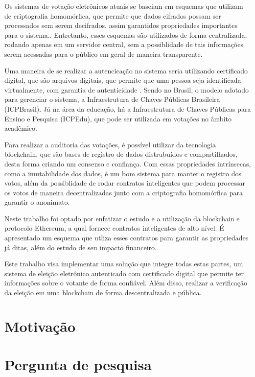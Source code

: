 \documentclass{ufsctex/ufsctex}
\begin{document}
Os sistemas de votação eletrônicos atuais se baseiam em esquemas que utilizam de criptografia
homomórfica, que permite que dados cifrados possam ser processados sem serem decifrados, assim
garantidos propriedades importantes para o sistema.\cite{springer}. Entretanto, esses esquemas
são utilizados de forma centralizada, rodando apenas em um servidor central, sem a possiblidade
de tais informações serem acessadas para o público em geral de maneira transparente.

Uma maneira de se realizar a autencicação no sistema seria utilizando certificado
digital, que são arquivos digitais, que permite que uma pessoa seja identificada
virtualmente, com garantia de autenticidade \cite{pki}. Sendo no Brasil, o modelo adotado para
gerenciar o sistema, a Infraestrutura de Chaves Públicas Brasileira (ICPBrasil). Já na área
da educação, há a Infraestrutura de Chaves Públicas para Ensino e Pesquisa (ICPEdu), que
pode ser utilizada em votações no âmbito acadêmico.

Para realizar a auditoria das votações, é possível utilizar da tecnologia
blockchain, que são bases de registro de dados distrubuídos e compartilhados,
desta forma criando um consenso e confiança. \cite{nakamoto2012bitcoin} Com essas
propriedades intrínsecas, como a imutabilidade dos dados, é um bom sistema para 
manter o registro dos votos, além da possiblidade de rodar contratos inteligentes que
podem processar os votos de maneira decentralizadas junto com a criptografia homomórfica
para garantir o anonimato.

Neste trabalho foi optado por enfatizar o estudo e a utilização da blockchain e protocolo
Ethereum, a qual fornece contratos inteligentes de alto nível. É apresentado um esquema
que utliza esses contratos para garantir as propriedades já ditas, além do estudo de seu
impacto financeiro.

Este trabalho visa implementar uma solução que integre todas estas partes, um sistema
de eleição eletrônico autenticado com certificado digital que permite ter informações
sobre o votante de forma confiável. Além disso, realizar a verificação da eleição em 
uma blockchain de forma descentralizada e pública.

\section{Motivação}

\section{Pergunta de pesquisa}
\end{document}
